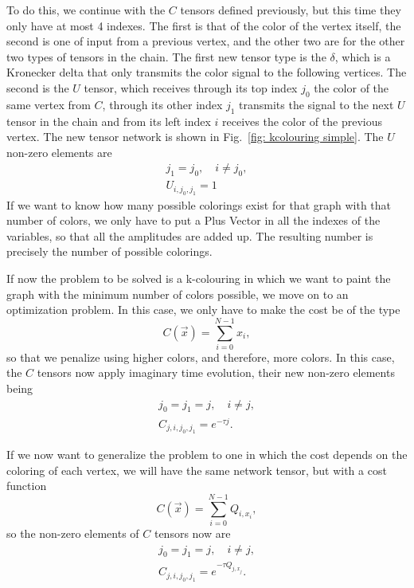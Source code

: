 To do this, we continue with the $C$ tensors defined previously, but this time they only have at most 4 indexes. The first is that of the color of the vertex itself, the second is one of input from a previous vertex, and the other two are for the other two types of tensors in the chain. The first new tensor type is the $\delta$, which is a Kronecker delta that only transmits the color signal to the following vertices. The second is the $U$ tensor, which receives through its top index $j_0$ the color of the same vertex from $C$, through its other index $j_1$ transmits the signal to the next $U$ tensor in the chain and from its left index $i$ receives the color of the previous vertex. The new tensor network is shown in Fig.~\ref{fig: kcolouring simple}. The $U$ non-zero elements are
\begin{equation}
    \begin{gathered}
        j_1 = j_0,\quad i\neq j_0,\\
        U_{i,j_0,j_1} = 1
    \end{gathered}
\end{equation}
If we want to know how many possible colorings exist for that graph with that number of colors, we only have to put a Plus Vector in all the indexes of the variables, so that all the amplitudes are added up. The resulting number is precisely the number of possible colorings.

If now the problem to be solved is a k-colouring in which we want to paint the graph with the minimum number of colors possible, we move on to an optimization problem. In this case, we only have to make the cost be of the type
\begin{equation}
    C(\vec{x}) = \sum_{i=0}^{N-1} x_i,
\end{equation}
so that we penalize using higher colors, and therefore, more colors. In this case, the $C$ tensors now apply imaginary time evolution, their new non-zero elements being
\begin{equation}
    \begin{gathered}
        j_0 = j_1 = j,\quad i\neq j,\\
        C_{j,i,j_0,j_1} = e^{-\tau j}.
    \end{gathered}
\end{equation}

If we now want to generalize the problem to one in which the cost depends on the coloring of each vertex, we will have the same network tensor, but with a cost function
\begin{equation}
    C(\vec{x}) = \sum_{i=0}^{N-1} Q_{i,x_i},
\end{equation}
so the non-zero elements of $C$ tensors now are
\begin{equation}
    \begin{gathered}
        j_0 = j_1 = j,\quad i\neq j,\\
        C_{j,i,j_0,j_1} = e^{-\tau Q_{j,x_j}}.
    \end{gathered}
\end{equation}


